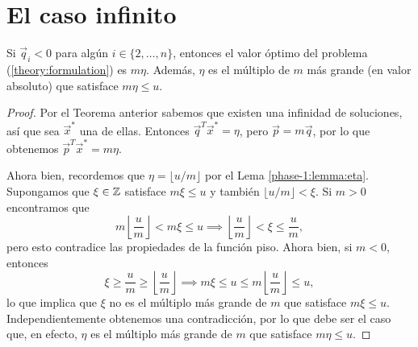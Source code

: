 \chapter{El caso infinito}






\begin{corollary}
	Si $\vec{q}_i < 0$ para algún $i \in \lbrace 2, \ldots, n \rbrace$, entonces el valor óptimo del
	problema (\ref{theory:formulation}) es $m\eta$. Además, $\eta$ es el múltiplo de $m$ más grande
	(en valor absoluto) que satisface $m\eta \leq u$.
\end{corollary}
\begin{proof}
	Por el Teorema anterior sabemos que existen una infinidad de soluciones, así que sea $\vec{x}^*$
	una de ellas. Entonces $\vec{q}^T\vec{x}^* = \eta$, pero $\vec{p} = m\vec{q}$, por lo que
	obtenemos $\vec{p}^T\vec{x}^* = m\eta$.

	Ahora bien, recordemos que $\eta = \lfloor u/m \rfloor$ por el Lema \ref{phase-1:lemma:eta}.
	Supongamos que $\xi \in \mathbb{Z}$ satisface $m\xi \leq u$ y también $\lfloor u/m \rfloor < \xi$. Si $m
	> 0$ encontramos que
	\begin{equation*}
		m\left\lfloor \frac{u}{m} \right\rfloor < m\xi \leq u
		\implies \left\lfloor \frac{u}{m} \right\rfloor < \xi \leq \frac{u}{m},
	\end{equation*}
	pero esto contradice las propiedades de la función piso. Ahora bien, si $m < 0$, entonces
	\begin{equation*}
		\xi \geq \frac{u}{m} \geq \left\lfloor \frac{u}{m} \right\rfloor
		\implies m\xi \leq u \leq m \left\lfloor \frac{u}{m} \right\rfloor \leq u,
	\end{equation*}
	lo que implica que $\xi$ no es el múltiplo más grande de $m$ que satisface $m\xi \leq u$.
	Independientemente obtenemos una contradicción, por lo que debe ser el caso que, en efecto,
	$\eta$ es el múltiplo más grande de $m$ que satisface $m\eta \leq u$.
\end{proof}



